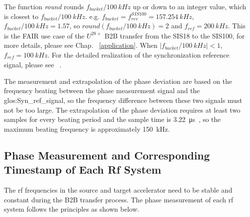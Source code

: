 The function \textit{round} rounds $f_{\mathit{bucket}}/\SI{100}{kHz}$ up or down to an integer value, which is closest to $f_{\mathit{bucket}}/\SI{100}{kHz}$. e.g. $f_{\mathit{bucket}}=f_\mathit{rev}^{SIS100}=\SI{157.254}{kHz}$, $f_{\mathit{bucket}}/\SI{100}{kHz}=1.57$, so $\textit{round} (f_{\mathit{bucket}}/\SI{100}{kHz})=2$ and $f_\mathit{ref}=\SI{200}{kHz}$. This is the FAIR use case of the $U^{28+}$ B2B transfer from the SIS18 to the SIS100, for more details, please see Chap. ~\ref{application}. When $|f_{\mathit{bucket}}/\SI{100}{kHz}|<1$, $f_\mathit{ref}=\SI{100}{kHz}$.  For the detailed realization of the synchronization reference signal, please see ~\cite{ferrand_development_nodate}.

The measurement and extrapolation of the phase deviation are based on the frequency beating between the phase measurement signal and the \gls{glos:Syn_ref_signal}, so the frequency difference between these two signals must not be too large. The extrapolation of the phase deviation requires at least two samples for every beating period and the sample time is \SI{3.22}{\us}~\cite{ferrand_development_nodate}, so the maximum beating frequency is approximately \SI{150}{kHz}. 

 
%
\subsection{Phase Measurement and Corresponding Timestamp of Each Rf System}
The rf frequencies in the source and target accelerator need to be stable and constant during the B2B transfer process. The phase measurement of each rf system follows the principles as shown below.

